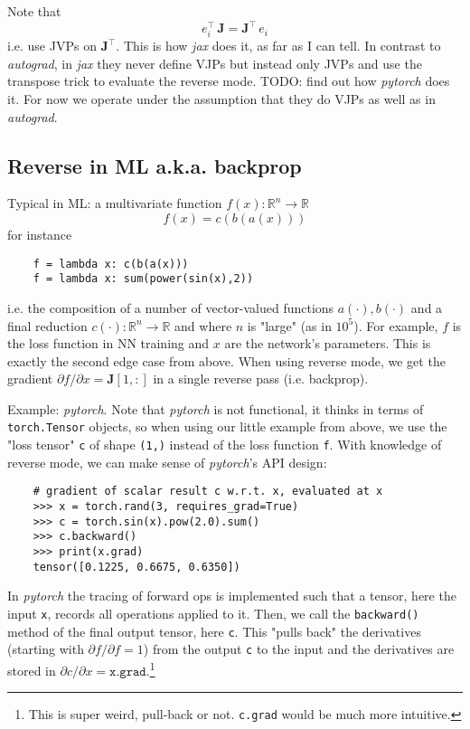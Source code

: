 \documentclass[paper=a4,11pt,headsepline]{scrartcl}
\newcommand{\ve}[1]{\ensuremath{\bm{\mathit{#1}}}}
\newcommand{\ma}[1]{\ensuremath{\bm{\mathbf{#1}}}}
\newcommand{\ra}{\ensuremath{\rightarrow}}
\newcommand{\pdi}[2]{\partial #1/\partial #2}
\newcommand{\soft}[1]{\textsl{#1}\xspace}
\newcommand{\pytorch}{\soft{pytorch}}
\newcommand{\jax}{\soft{jax}}
\newcommand{\autograd}{\soft{autograd}}
\newcommand{\co}[1]{\texttt{#1}}
\begin{document}
Note that
\begin{equation*}
    \ve e_i^\top\,\ma J = \ma J^\top\,\ve e_i
\end{equation*}
i.e. use JVPs on $\ma J^\top$. This is how \jax does it, as far as I
can tell. In contrast to \autograd, in \jax they never define
VJPs but instead only JVPs and use the transpose trick to evaluate the reverse
mode. TODO: find out how \pytorch does it. For now we operate under the
assumption that they do VJPs as well as in \autograd.

\subsection{Reverse in ML a.k.a. backprop}

Typical in ML: a multivariate function $f(\ve x): \mathbb R^n\ra \mathbb R$
\begin{equation*}
    f(\ve x) = c(\ve b(\ve a(\ve x)))
\end{equation*}
for instance
\begin{verbatim}
    f = lambda x: c(b(a(x)))
    f = lambda x: sum(power(sin(x),2))
\end{verbatim}
i.e. the composition of a number of vector-valued functions $\ve a(\cdot), \ve
b(\cdot)$ and a final reduction $c(\cdot): \mathbb R^n\ra \mathbb R$ and where
$n$ is "large" (as in $10^5$). For example, $f$ is the loss function in NN
training and $\ve x$ are the network's parameters. This is exactly the second
edge case from above. When using reverse mode, we get the gradient $\pdi{f}{\ve
x} = \ma J[1,:]$ in a single reverse pass (i.e. backprop).

Example: \pytorch. Note that \pytorch is not functional, it thinks in terms of
\co{torch.Tensor} objects, so when using our little example from above, we
use the "loss tensor" \co{c} of shape \co{(1,)} instead of the loss
function \co{f}. With knowledge of reverse mode, we can make sense of
\pytorch's API design:
%
\begin{verbatim}
    # gradient of scalar result c w.r.t. x, evaluated at x
    >>> x = torch.rand(3, requires_grad=True)
    >>> c = torch.sin(x).pow(2.0).sum()
    >>> c.backward()
    >>> print(x.grad)
    tensor([0.1225, 0.6675, 0.6350])
\end{verbatim}
%
In \pytorch the tracing of forward ops is implemented such that a tensor, here
the input \co{x}, records all operations applied to it. Then, we call the
\co{backward()} method of the final output tensor, here \co{c}. This
"pulls back" the derivatives (starting with $\pdi{f}{f}=1$) from the output
\co{c} to the input and the derivatives are stored in $\pdi{c}{\ve x} =
\co{x.grad}$.\footnote{This is super weird, pull-back or not.
\co{c.grad} would be much more intuitive.}
\end{document}
